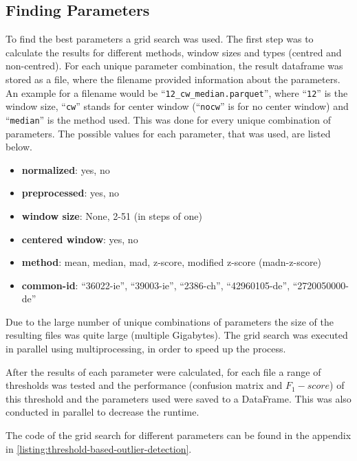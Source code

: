 \subsection{Finding Parameters}
To find the best parameters a grid search was used. The first step was to calculate the results for different methods, window sizes and types (centred and non-centred). For each unique parameter combination, the result dataframe was stored as a file, where the filename provided information about the parameters. An example for a filename would be ``\verb|12_cw_median.parquet|'', where ``\verb|12|'' is the window size, ``\verb|cw|'' stands for center window (``\verb|nocw|'' is for no center window) and ``\verb|median|'' is the method used. This was done for every unique combination of parameters. The possible values for each parameter, that was used, are listed below.
\begin{itemize}
    \item \textbf{normalized}: yes, no
    \item \textbf{preprocessed}: yes, no 
    \item \textbf{window size}: None, 2-51 (in steps of one)
    \item \textbf{centered window}: yes, no
    \item \textbf{method}: mean, median, mad, z-score, modified z-score (madn-z-score)
    \item \textbf{common-id}: ``36022-ie'', ``39003-ie'', ``2386-ch'', ``42960105-de'', ``2720050000-de''
\end{itemize}
Due to the large number of unique combinations of parameters the size of the resulting files was quite large (multiple Gigabytes). The grid search was executed in parallel using multiprocessing, in order to speed up the process.
\par
After the results of each parameter were calculated, for each file a range of thresholds was tested and the performance (confusion matrix and $F_1-score$) of this threshold and the parameters used were saved to a DataFrame. This was also conducted in parallel to decrease the runtime.
\par
The code of the grid search for different parameters can be found in the appendix in \autoref{listing:threshold-based-outlier-detection}.

